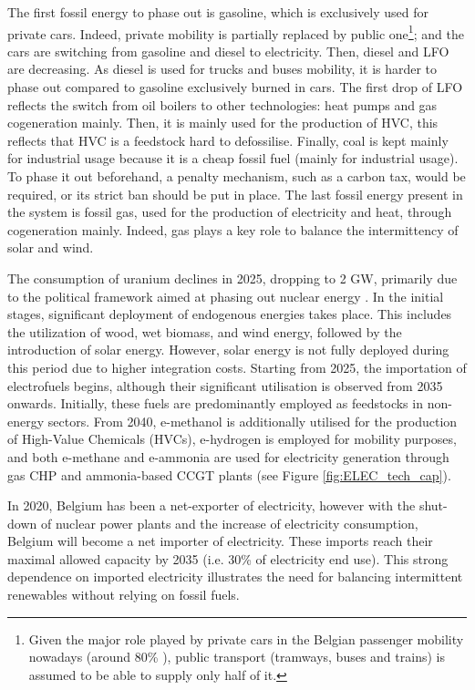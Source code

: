 The first fossil energy to phase out is gasoline, which is exclusively used for private cars. Indeed, private mobility is partially replaced by public one\footnote{Given the major role played by private cars in the Belgian passenger mobility nowadays (\ie around 80\% \cite{BFP_mob}), public transport (\eg tramways, buses and trains) is assumed to be able to supply only half of it.}; and the cars are switching from gasoline and diesel to electricity. Then, diesel and \gls{LFO} are decreasing. As diesel is used for trucks and buses mobility, it is harder to phase out compared to gasoline exclusively burned in cars. The first drop of \gls{LFO} reflects the switch from oil boilers to other technologies: heat pumps and gas cogeneration mainly. Then, it is mainly used for the production of \gls{HVC}, this reflects that \gls{HVC} is a feedstock hard to defossilise. Finally, coal is kept mainly for industrial usage because it is a cheap fossil fuel (mainly for industrial usage). To phase it out beforehand, a penalty mechanism, such as a carbon tax, would be required, or its strict ban should be put in place. The last fossil energy present in the system is fossil gas, used for the production of electricity and heat, through cogeneration mainly. Indeed, gas plays a key role to balance the intermittency of solar and wind.

The consumption of uranium declines in 2025, dropping to 2 GW, primarily due to the political framework aimed at phasing out nuclear energy \cite{nuclear_2035}. In the initial stages, significant deployment of endogenous energies takes place. This includes the utilization of wood, wet biomass, and wind energy, followed by the introduction of solar energy. However, solar energy is not fully deployed during this period due to higher integration costs. Starting from 2025, the importation of electrofuels begins, although their significant utilisation is observed from 2035 onwards. Initially, these fuels are predominantly employed as feedstocks in non-energy sectors. From 2040, e-methanol is additionally utilised for the production of High-Value Chemicals (HVCs), e-hydrogen is employed for mobility purposes, and both e-methane and e-ammonia are used for electricity generation through gas \gls{CHP} and ammonia-based \gls{CCGT} plants (see Figure \ref{fig:ELEC_tech_cap}).

In 2020, Belgium has been a net-exporter of electricity, however with the shut-down of nuclear power plants and the increase of electricity consumption, Belgium will become a net importer of electricity. These imports reach their maximal allowed capacity by 2035 (i.e. 30\% of electricity end use). This strong dependence on imported electricity illustrates the need for balancing intermittent renewables without relying on fossil fuels.

